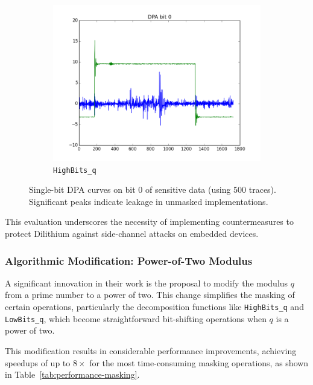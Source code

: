 \begin{figure}[h]
\begin{subfigure}[b]{0.3\textwidth}
        \includegraphics[width=\textwidth]{../figures/HighBits.png}
        \caption{\texttt{HighBits\_q}}
        \label{fig:highbits}
    \end{subfigure}
    \caption{Single-bit DPA curves on bit 0 of sensitive data (using 500 traces). Significant peaks indicate leakage in unmasked implementations.}
    \label{fig:dpa_curves}
\end{figure}

This evaluation underscores the necessity of implementing countermeasures to protect Dilithium against side-channel attacks on embedded devices.

\subsubsection{Algorithmic Modification: Power-of-Two Modulus}

A significant innovation in their work is the proposal to modify the modulus $q$ from a prime number to a power of two. This change simplifies the masking of certain operations, particularly the decomposition functions like \texttt{HighBits\_q} and \texttt{LowBits\_q}, which become straightforward bit-shifting operations when $q$ is a power of two.

This modification results in considerable performance improvements, achieving speedups of up to $8\times$ for the most time-consuming masking operations, as shown in Table~\ref{tab:performance-masking}.


